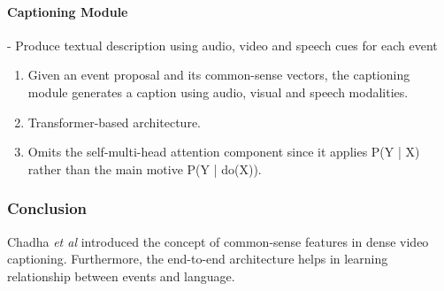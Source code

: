 \paragraph{Captioning Module} - Produce textual description using audio, video and speech cues for each event
\begin{enumerate}
	\item Given an event proposal and its common-sense vectors, the captioning module generates a caption using audio, visual and speech modalities.
	\item Transformer-based architecture.
	\item Omits the self-multi-head attention component since it applies P(Y | X) rather than the main motive P(Y | do(X)).
\end{enumerate}


\subsubsection{Conclusion}

\par Chadha \textit{et al} introduced the concept of common-sense features in dense video captioning. Furthermore, the end-to-end architecture helps in learning relationship between events and language. 